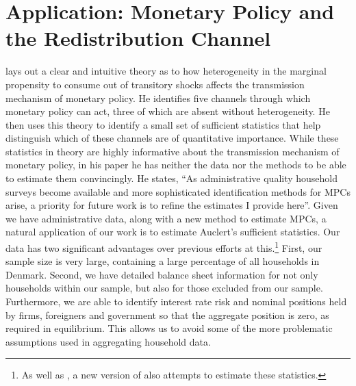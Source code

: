 \documentclass[titlepage]{\econtex}\newcommand{\texname}{ConsumptionHeterogeneity}
\begin{document}
\section{Application: Monetary Policy and the Redistribution Channel} \label{application}
\cite{auclert_monetary_2017} lays out a clear and intuitive theory as to how heterogeneity in the marginal propensity to consume out of transitory shocks affects the transmission mechanism of monetary policy. He identifies five channels through which monetary policy can act, three of which are absent without heterogeneity. He then uses this theory to identify a small set of sufficient statistics that help distinguish which of these channels are of quantitative importance. While these statistics in theory are highly informative about the transmission mechanism of monetary policy, in his paper he has neither the data nor the methods to be able to estimate them convincingly. He states, ``As administrative quality household surveys become available and more sophisticated identification methods for MPCs arise, a priority for future work is to refine the estimates I provide here''. Given we have administrative data, along with a new method to estimate MPCs, a natural application of our work is to estimate Auclert's sufficient statistics. Our data has two significant advantages over previous efforts at this.\footnote{As well as \cite{auclert_monetary_2017}, a new version of \cite{fagereng_mpc_2016} also attempts to estimate these statistics.} First, our sample size is very large, containing a large percentage of all households in Denmark. Second, we have detailed balance sheet information for not only households within our sample, but also for those excluded from our sample. Furthermore, we are able to identify interest rate risk and nominal positions held by firms, foreigners and government so that the aggregate position is zero, as required in equilibrium. This allows us to avoid some of the more problematic assumptions used in aggregating household data.
\end{document}
